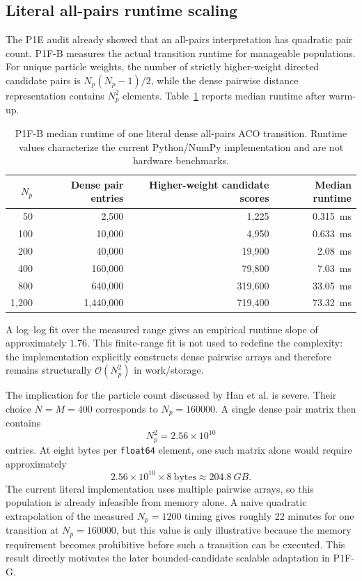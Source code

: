 \subsection{Literal all-pairs runtime scaling}
The P1E audit already showed that an all-pairs interpretation has quadratic pair count. P1F-B measures the actual transition runtime for manageable populations. For unique particle weights, the number of strictly higher-weight directed candidate pairs is $N_p(N_p-1)/2$, while the dense pairwise distance representation contains $N_p^2$ elements. Table~\ref{tab:p1fb_runtime} reports median runtime after warm-up.

\begin{table}[htbp]
    \centering
    \caption{P1F-B median runtime of one literal dense all-pairs ACO transition. Runtime values characterize the current Python/NumPy implementation and are not hardware benchmarks.}
    \label{tab:p1fb_runtime}
    \begin{tabular}{rrrr}
        \toprule
        $N_p$ & Dense pair entries & Higher-weight candidate scores & Median runtime\\
        \midrule
        50   & 2,500     & 1,225   & \SI{0.315}{ms}\\
        100  & 10,000    & 4,950   & \SI{0.633}{ms}\\
        200  & 40,000    & 19,900  & \SI{2.08}{ms}\\
        400  & 160,000   & 79,800  & \SI{7.03}{ms}\\
        800  & 640,000   & 319,600 & \SI{33.05}{ms}\\
        1,200& 1,440,000 & 719,400 & \SI{73.32}{ms}\\
        \bottomrule
    \end{tabular}
\end{table}

A log--log fit over the measured range gives an empirical runtime slope of approximately $1.76$. This finite-range fit is not used to redefine the complexity: the implementation explicitly constructs dense pairwise arrays and therefore remains structurally $\mathcal O(N_p^2)$ in work/storage.

The implication for the particle count discussed by Han et al. is severe. Their choice $N=M=400$ corresponds to $N_p=160000$. A single dense pair matrix then contains
\begin{equation}
    N_p^2=2.56\times10^{10}
\end{equation}
entries. At eight bytes per \texttt{float64} element, one such matrix alone would require approximately
\begin{equation}
    2.56\times10^{10}\times 8\ \mathrm{bytes}
    \approx \SI{204.8}{GB}.
\end{equation}
The current literal implementation uses multiple pairwise arrays, so this population is already infeasible from memory alone. A naive quadratic extrapolation of the measured $N_p=1200$ timing gives roughly 22 minutes for one transition at $N_p=160000$, but this value is only illustrative because the memory requirement becomes prohibitive before such a transition can be executed. This result directly motivates the later bounded-candidate scalable adaptation in P1F-G.

